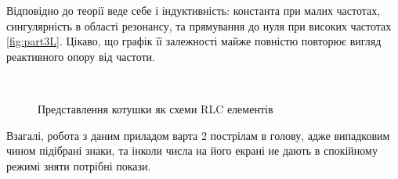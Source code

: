 Відповідно до теорії веде себе і індуктивність: константа при малих частотах, сингулярність в області резонансу, та прямування до нуля при високих частотах \ref{fig:part3L}. Цікаво, що графік її залежності майже повністю повторює вигляд реактивного опору від частоти.

\begin{figure}[h]    
         \\
    \caption{Представлення котушки як схеми RLC елементів}
    \label{fig:ssanahuina}
\end{figure}

Взагалі, робота з даним приладом варта 2 пострілам в голову, адже випадковим чином підібрані знаки, та інколи числа на його екрані не дають в спокійному режимі зняти потрібні покази.